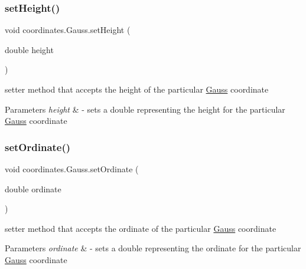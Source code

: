 \subsubsection{\texorpdfstring{set\+Height()}{setHeight()}}
{\footnotesize\ttfamily void coordinates.\+Gauss.\+set\+Height (\begin{DoxyParamCaption}\item[{double}]{height }\end{DoxyParamCaption})}



setter method that accepts the height of the particular \hyperlink{classcoordinates_1_1_gauss}{Gauss} coordinate 


\begin{DoxyParams}{Parameters}
{\em height} & -\/ sets a double representing the height for the particular \hyperlink{classcoordinates_1_1_gauss}{Gauss} coordinate \\
\hline
\end{DoxyParams}
\mbox{\label{classcoordinates_1_1_gauss_a3afbbdd05c3a68dd778760cb824b0b03}} 
\subsubsection{\texorpdfstring{set\+Ordinate()}{setOrdinate()}}
{\footnotesize\ttfamily void coordinates.\+Gauss.\+set\+Ordinate (\begin{DoxyParamCaption}\item[{double}]{ordinate }\end{DoxyParamCaption})}



setter method that accepts the ordinate of the particular \hyperlink{classcoordinates_1_1_gauss}{Gauss} coordinate 


\begin{DoxyParams}{Parameters}
{\em ordinate} & -\/ sets a double representing the ordinate for the particular \hyperlink{classcoordinates_1_1_gauss}{Gauss} coordinate \\
\hline
\end{DoxyParams}
\mbox{\label{classcoordinates_1_1_gauss_a5f0cc370abdab913a51a7395bc54ff24}} 
